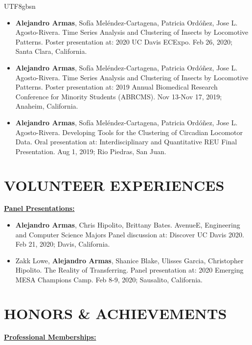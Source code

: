 \documentclass[11pt,a4paper,palatine]{moderncv}        %
\begin{document}
\begin{CJK*}{UTF8}{gbsn}
  {\begin{itemize}
    \item \textbf{Alejandro Armas}, Sofía Meléndez-Cartagena, Patricia Ordóñez, Jose L. Agosto-Rivera. Time Series Analysis and Clustering of Insects by Locomotive Patterns. Poster presentation at: 2020 UC Davis ECExpo. Feb 26, 2020; Santa Clara, California.
    \item \textbf{Alejandro Armas}, Sofía Meléndez-Cartagena, Patricia Ordóñez, Jose L. Agosto-Rivera. Time Series Analysis and Clustering of Insects by Locomotive Patterns. Poster presentation at: 2019 Annual Biomedical Research Conference for Minority Students (ABRCMS). Nov 13-Nov 17, 2019; Anaheim, California.
    \item \textbf{Alejandro Armas}, Sofía Meléndez-Cartagena, Patricia Ordóñez, Jose L. Agosto-Rivera. Developing Tools for the Clustering of Circadian Locomotor Data. Oral presentation at: Interdisciplinary and Quantitative REU Final Presentation. Aug 1, 2019; Rio Piedras, San Juan.

  \end{itemize}
}

\section{VOLUNTEER EXPERIENCES}

\underline{\textbf{Panel Presentations:}}

\quad

  {\begin{itemize}
    \item \textbf{Alejandro Armas}, Chris Hipolito, Brittany Bates.  AvenueE, Engineering and Computer Science Majors Panel discussion at: Discover UC Davis 2020. Feb 21, 2020; Davis, California.
    \item Zakk Lowe, \textbf{Alejandro Armas}, Shanice Blake, Ulisses Garcia, Christopher Hipolito. The Reality of Transferring. Panel presentation at: 2020 Emerging MESA Champions Camp. Feb 8-9, 2020; Sausalito, California.


  \end{itemize}
}

\section{HONORS \& ACHIEVEMENTS}
\begin{minipage}{\maincolumnwidth}%

  \underline{\textbf{Professional Memberships:}}


\end{minipage}
\end{CJK*}
\end{document}
